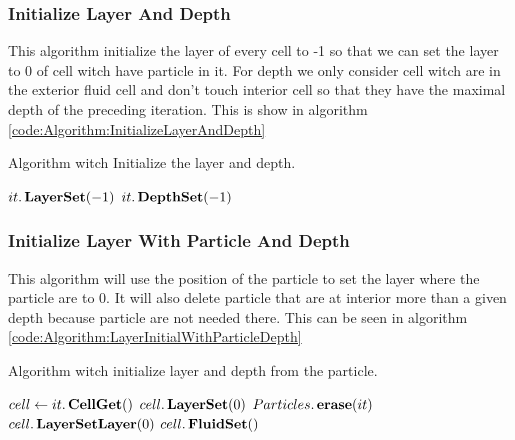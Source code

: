 \subsubsection{Initialize Layer And Depth}

This algorithm initialize the layer of every cell to -1 so that we can set the layer to 0 of cell witch have particle in it.
For depth we only consider cell witch are in the exterior fluid cell and don't touch interior cell so that they have the maximal depth
of the preceding iteration.
This is show in algorithm \ref{code:Algorithm:InitializeLayerAndDepth}

\begin{algorithm}
\caption{Algorithm witch Initialize the layer and depth.}
\label{code:Algorithm:InitializeLayerAndDepth}
\begin{algorithmic}[1]
			\State $it.\mathop{\textbf{LayerSet}}(-1)$
			 
				\State $it.\mathop{\textbf{DepthSet}}(-1)$ 
			\EndIf
\EndFor
\EndProcedure
\end{algorithmic}
\end{algorithm}

\subsubsection{Initialize Layer With Particle And Depth}

This algorithm will use the position of the particle to set the layer where the particle are to $0$.
It will also delete particle that are at interior more than a given depth because particle are not needed there.
This can be seen in algorithm \ref{code:Algorithm:LayerInitialWithParticleDepth}

\begin{algorithm}
\caption{Algorithm witch initialize layer and depth from the particle.}
\label{code:Algorithm:LayerInitialWithParticleDepth}
\begin{algorithmic}[1]
 
\State $cell \gets it.\mathop{\textbf{CellGet}}()$ 
				\State $cell.\mathop{\textbf{LayerSet}}(0)$
				 
					\State $Particles.\mathop{\textbf{erase}}(it)$ 
				\EndIf
			\Else
				\State $cell.\mathop{\textbf{LayerSetLayer}}(0)$
				\State $cell.\mathop{\textbf{FluidSet}}()$ 
			\EndIf
\EndFor
\EndProcedure
\end{algorithmic}
\end{algorithm}

